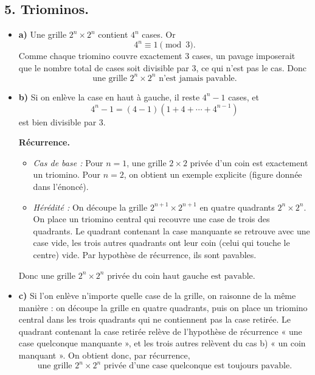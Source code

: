 \subsection*{5. Triominos.}
\begin{itemize}
    \item \textbf{a)} Une grille \(2^n \times 2^n\) contient \(4^n\) cases. Or
    \[4^n \equiv 1 \pmod{3}.\]
    Comme chaque triomino couvre exactement 3 cases, un pavage imposerait que le nombre total de cases soit divisible par 3, ce qui n'est pas le cas. Donc
    \[\boxed{\text{une grille } 2^n \times 2^n \text{ n’est jamais pavable.}}\]

    \item \textbf{b)} Si on enlève la case en haut à gauche, il reste \(4^n - 1\) cases, et
    \[4^n - 1 = (4 - 1)(1 + 4 + \cdots + 4^{n-1})\]
    est bien divisible par 3.

    \textbf{Récurrence.}
    \begin{itemize}
        \item \textit{Cas de base :} Pour \(n = 1\), une grille \(2 \times 2\) privée d’un coin est exactement un triomino. Pour \(n = 2\), on obtient un exemple explicite (figure donnée dans l'énoncé).
        \item \textit{Hérédité :} On découpe la grille \(2^{n+1} \times 2^{n+1}\) en quatre quadrants \(2^n \times 2^n\). On place un triomino central qui recouvre une case de trois des quadrants. Le quadrant contenant la case manquante se retrouve avec une case vide, les trois autres quadrants ont leur coin (celui qui touche le centre) vide. Par hypothèse de récurrence, ils sont pavables.
    \end{itemize}
    Donc \(\boxed{\text{une grille } 2^n \times 2^n \text{ privée du coin haut gauche est pavable.}}\)

    \item \textbf{c)} Si l’on enlève n’importe quelle case de la grille, on raisonne de la même manière : on découpe la grille en quatre quadrants, puis on place un triomino central dans les trois quadrants qui ne contiennent pas la case retirée. Le quadrant contenant la case retirée relève de l’hypothèse de récurrence « une case quelconque manquante », et les trois autres relèvent du cas b) « un coin manquant ». On obtient donc, par récurrence,
    \[\boxed{\text{une grille } 2^n \times 2^n \text{ privée d’une case quelconque est toujours pavable.}}\]
\end{itemize}

